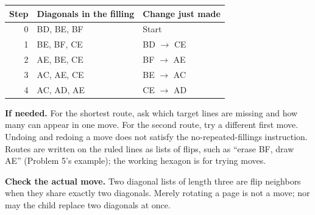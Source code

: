 \documentclass[11pt,letterpaper]{article}
\newcommand{\hint}[1]{\par\textbf{If needed.} #1\par}
\begin{document}
\begin{center}\begin{tabular}{rll}\toprule Step & Diagonals in the filling & Change just made\\\midrule
0 & BD, BE, BF & Start\\
1 & BE, BF, CE & BD $\to$ CE\\
2 & AE, BE, CE & BF $\to$ AE\\
3 & AC, AE, CE & BE $\to$ AC\\
4 & AC, AD, AE & CE $\to$ AD\\
\bottomrule\end{tabular}\end{center}

\hint{For the shortest route, ask which target lines are missing and how many can appear in one move. For the second route, try a different first move. Undoing and redoing a move does not satisfy the no-repeated-fillings instruction. Routes are written on the ruled lines as lists of flips, such as ``erase BF, draw AE'' (Problem 5's example); the working hexagon is for trying moves.}
\textbf{Check the actual move.} Two diagonal lists of length three are flip neighbors when they share exactly two diagonals. Merely rotating a page is not a move; nor may the child replace two diagonals at once.
\end{document}
